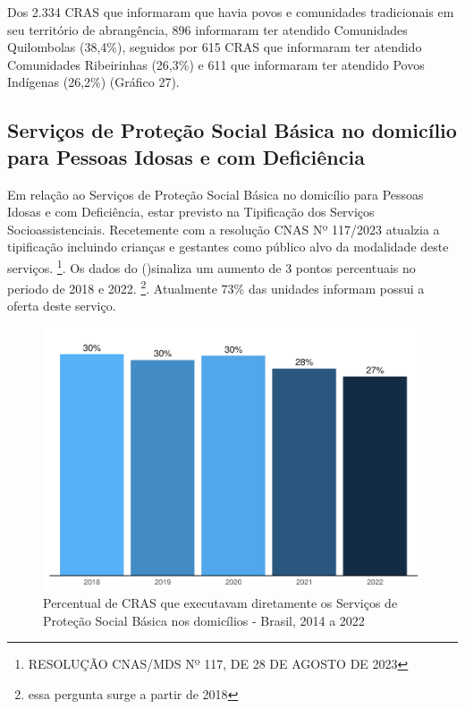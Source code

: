 \documentclass[
  brazilian]{report}
\begin{document}
Dos 2.334 CRAS que informaram que havia povos e comunidades tradicionais
em seu território de abrangência, 896 informaram ter atendido
Comunidades Quilombolas (38,4\%), seguidos por 615 CRAS que informaram
ter atendido Comunidades Ribeirinhas (26,3\%) e 611 que informaram ter
atendido Povos Indígenas (26,2\%) (Gráfico 27).

\hypertarget{serviuxe7os-de-proteuxe7uxe3o-social-buxe1sica-no-domicuxedlio-para-pessoas-idosas-e-com-deficiuxeancia}{%
\subsection{Serviços de Proteção Social Básica no domicílio para Pessoas
Idosas e com
Deficiência}\label{serviuxe7os-de-proteuxe7uxe3o-social-buxe1sica-no-domicuxedlio-para-pessoas-idosas-e-com-deficiuxeancia}}

Em relação ao Serviços de Proteção Social Básica no domicílio para
Pessoas Idosas e com Deficiência, estar previsto na Tipificação dos
Serviços Socioassistenciais. Recetemente com a resolução CNAS Nº
117/2023 atualzia a tipificação incluindo crianças e gestantes como
público alvo da modalidade deste serviços.
\footnote{RESOLUÇÃO CNAS/MDS Nº 117, DE 28 DE AGOSTO DE 2023}. Os dados
do ()sinaliza um aumento de 3 pontos percentuais no
periodo de 2018 e 2022. \footnote{essa pergunta surge a partir de 2018}.
Atualmente 73\% das unidades informam possui a oferta deste serviço.

\begin{figure}
\includegraphics{Censo-SUAS-2022_files/figure-latex/CRAS-PSB-1} \caption[Percentual de CRAS que executavam diretamente os Serviços de Proteção Social Básica nos domicílios - Brasil, 2014 a 2022]{Percentual de CRAS que executavam diretamente os Serviços de Proteção Social Básica nos domicílios - Brasil, 2014 a 2022}\label{fig:CRAS-PSB}
\end{figure}
\end{document}
